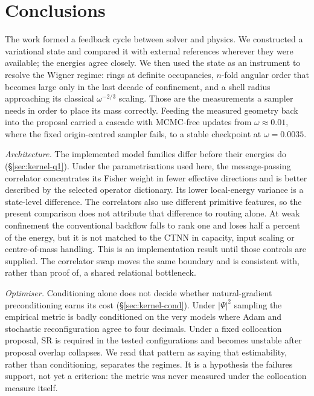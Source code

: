 \clearpage
{}

\begingroup
\let\clearpage\relax
\let\cleardoublepage\relax
\chapter{Conclusions}
\label{ch:conclusions}
\endgroup

The work formed a feedback cycle between solver and physics. We constructed a variational
state and compared it with external references wherever they were available; the energies
agree closely. We then used the state as an instrument to resolve the Wigner regime: rings at
definite occupancies, $n$-fold angular order that becomes large only in the last decade of
confinement, and a shell radius approaching its classical $\omega^{-2/3}$ scaling. Those are the
measurements a sampler needs in order to place its mass correctly. Feeding the measured
geometry back into the proposal carried a cascade with MCMC-free updates from
$\omega\approx0.01$, where the fixed origin-centred sampler fails, to a stable checkpoint at
$\omega=0.0035$.

\emph{Architecture.} The implemented model families differ before their energies do
(\S\ref{sec:kernel-q1}). Under the parametrisations used here, the message-passing correlator
concentrates its Fisher weight in fewer effective directions and is better described by the
selected operator dictionary. Its lower local-energy variance is a state-level difference.
The correlators also use different primitive features, so the present comparison does not
attribute that difference to routing alone. At weak confinement the conventional backflow
falls to rank one and loses half a percent of the energy, but it is not matched to the CTNN in
capacity, input scaling or centre-of-mass handling. This is an implementation result until
those controls are supplied. The correlator swap moves the same boundary and is consistent
with, rather than proof of, a shared relational bottleneck.

\emph{Optimiser.} Conditioning alone does not decide whether natural-gradient
preconditioning earns its cost (\S\ref{sec:kernel-cond}). Under $|\Psi|^2$ sampling the
empirical metric is badly conditioned on the very models where Adam and stochastic
reconfiguration agree to four decimals. Under a fixed collocation proposal, SR is required
in the tested configurations and becomes unstable after proposal overlap collapses. We read
that pattern as saying that estimability, rather than conditioning,
separates the regimes. It is a hypothesis the failures support, not yet a criterion: the
metric was never measured under the collocation measure itself.

